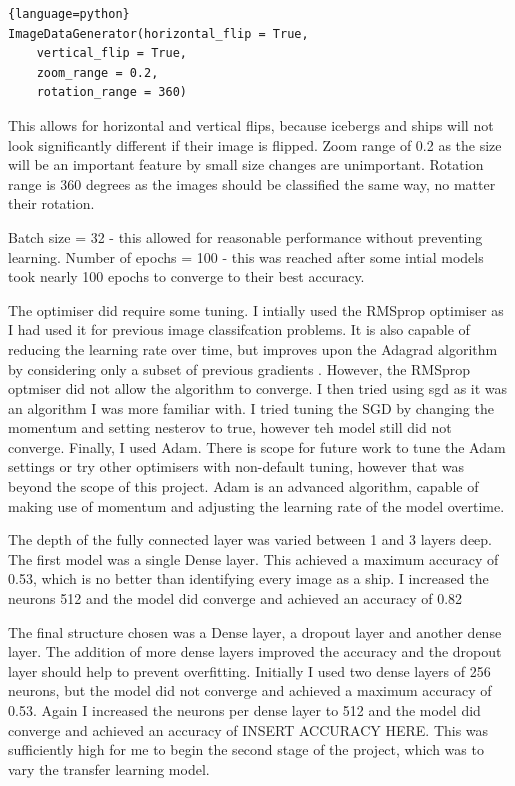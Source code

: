\documentclass{article}
\begin{document}
\begin{lstlisting}{language=python}
ImageDataGenerator(horizontal_flip = True,
	vertical_flip = True,
	zoom_range = 0.2,
	rotation_range = 360)
\end{lstlisting}

This allows for horizontal and vertical flips, because icebergs and ships will not look significantly different if their image is flipped. Zoom range of 0.2 as the size will be an important feature by small size changes are unimportant. Rotation range is 360 degrees as the images should be classified the same way, no matter their rotation. 

Batch size = 32 - this allowed for reasonable performance without preventing learning. 
Number of epochs = 100 - this was reached after some intial models took nearly 100 epochs to converge to their best accuracy.

The optimiser did require some tuning. I intially used the RMSprop optimiser as I had used it for previous image classifcation problems. It is also capable of reducing the learning rate over time, but improves upon the Adagrad algorithm by considering only a subset of previous gradients \cite{ruder2016overview}. However, the RMSprop optmiser did not allow the algorithm to converge. I then tried using sgd as it was an algorithm I was more familiar with. I tried tuning the SGD by changing the momentum and setting nesterov to true, however teh model still did not converge. Finally, I used Adam. There is scope for future work to tune the Adam settings or try other optimisers with non-default tuning, however that was beyond the scope of this project. Adam is an advanced algorithm, capable of making use of momentum and adjusting the learning rate of the model overtime. \cite{ruder2016overview}

The depth of the fully connected layer was varied between 1 and 3 layers deep. The first model was a single Dense layer. This achieved a maximum accuracy of 0.53, which is no better than identifying every image as a ship. I increased the neurons  512 and the model did converge and achieved an accuracy of 0.82

The final structure chosen was a Dense layer, a dropout layer and another dense layer. The addition of more dense layers improved the accuracy and the dropout layer should help to prevent overfitting. Initially I used two dense layers of 256 neurons, but the model did not converge and achieved a maximum accuracy of 0.53. Again I increased the neurons per dense layer to 512 and the model did converge and achieved an accuracy of INSERT ACCURACY HERE. This was sufficiently high for me to begin the second stage of the project, which was to vary the transfer learning model. 
\end{document}
